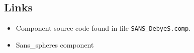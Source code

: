 \subsection*{Links}
\begin{itemize}
  \item Component source code found in file \texttt{SANS\_DebyeS.comp}.
  \item Sans\_spheres component
\end{itemize}

